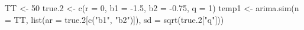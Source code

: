 \begin{Schunk}
\begin{Sinput}
 TT <- 50
 true.2 <- c(r = 0, b1 = -1.5, b2 = -0.75, q = 1)
 temp1 <- arima.sim(n = TT, list(ar = true.2[c("b1", "b2")]), 
                    sd = sqrt(true.2["q"]))
\end{Sinput}
\end{Schunk}
